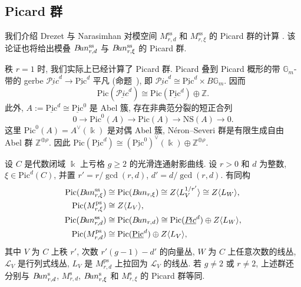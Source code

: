 \subsection{Picard 群}\label{src:9.4.5-subsection}
我们介绍 Drezet 与 Narasimhan 对模空间 $M_{r,d}^{\mathrm{ss}}$ 和 $M_{r,\xi}^{\mathrm{ss}}$ 的 Picard 群的计算 \cite[定理 B 和 C]{DN89}. 该论证也将给出模叠 $B\!un_{r,d}^{\mathrm{ss}}$ 与 $B\!un_{r,\xi}^{\mathrm{ss}}$ 的 Picard 群.

秩 $r=1$ 时, 我们实际上已经计算了 Picard 群. Picard 叠到 Picard 概形的带 $\mathbb G_m$-带的 gerbe $\underline{\mathcal P\!ic}^d\to\underline{\mathrm{Pic}}^d$ 平凡 (命题~), 即 $\underline{\mathcal P\!ic}^d\cong\underline{\mathrm{Pic}}^d\times B\mathbb G_m$. 因而
\[
\mathrm{Pic}(\underline{\mathcal P\!ic}^d)\cong\mathrm{Pic}(\underline{\mathrm{Pic}}^d)\oplus\mathbb Z.
\]
此外, $A:=\underline{\mathrm{Pic}}^d\cong\underline{\mathrm{Pic}}^0$ 是 Abel 簇, 存在非典范分裂的短正合列
\[
0\longrightarrow\mathrm{Pic}^0(A)\longrightarrow\mathrm{Pic}(A)\longrightarrow\mathrm{NS}(A)\longrightarrow0.
\]
这里 $\mathrm{Pic}^0(A)=A^\vee(\Bbbk)$ 是对偶 Abel 簇, N\'eron--Severi 群是有限生成自由 Abel 群 $\mathbb Z^{\oplus\rho}$. 因此 $\mathrm{Pic}(\underline{\mathrm{Pic}}^d)\cong(\underline{\mathrm{Pic}}^0)^\vee(\Bbbk)\oplus\mathbb Z^{\oplus\rho}$.
\begin{theorem}\label{src:9.4.36}
设 $C$ 是代数闭域 $\Bbbk$ 上亏格 $g\geq2$ 的光滑连通射影曲线. 设 $r>0$ 和 $d$ 为整数, $\xi\in\mathrm{Pic}^d(C)$, 并置 $r'=r/\gcd(r,d)$, $d'=d/\gcd(r,d)$. 有同构
\[
\begin{aligned}
\mathrm{Pic}(B\!un_{r,\xi}^{\mathrm{ss}})&\cong\mathrm{Pic}(B\!un_{r,\xi})\cong Z\langle L_V^{1/r'}\rangle\cong Z\langle L_W\rangle,\\
\mathrm{Pic}(M_{r,\xi}^{\mathrm{ps}})&\cong Z\langle L_V\rangle,\\
\mathrm{Pic}(B\!un_{r,d}^{\mathrm{ss}})&\cong\mathrm{Pic}(B\!un_{r,d})\cong\mathrm{Pic}(\underline{P\!ic}^d)\oplus Z\langle L_W\rangle,\\
\mathrm{Pic}(M_{r,d}^{\mathrm{ps}})&\cong\mathrm{Pic}(\underline{\mathrm{Pic}}^d)\oplus Z\langle L_V\rangle,
\end{aligned}
\]
其中 $V$ 为 $C$ 上秩 $r'$, 次数 $r'(g-1)-d'$ 的向量丛, $W$ 为 $C$ 上任意次数的线丛, $\mathcal L_V$ 是行列式线丛, $L_V$ 是 $M_{r,d}^{\mathrm{ps}}$ 上拉回为 $\mathcal L_V$ 的线丛. 若 $g\neq2$ 或 $r\neq2$, 上述群还分别与 $B\!un_{r,d}^{\mathrm s}$, $M_{r,d}^{\mathrm s}$, $B\!un_{r,\xi}^{\mathrm s}$ 和 $M_{r,\xi}^{\mathrm s}$ 的 Picard 群等同.
\end{theorem}
